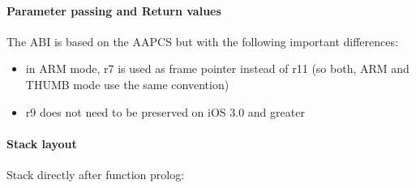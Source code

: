 \paragraph{Parameter passing and Return values}

The ABI is based on the AAPCS but with the following important differences:

\begin{itemize}
\item in ARM mode, r7 is used as frame pointer instead of r11 (so both, ARM and THUMB mode use the same convention)
\item r9 does not need to be preserved on iOS 3.0 and greater
\end{itemize}


\clearpage

\paragraph{Stack layout}

Stack directly after function prolog:\\


